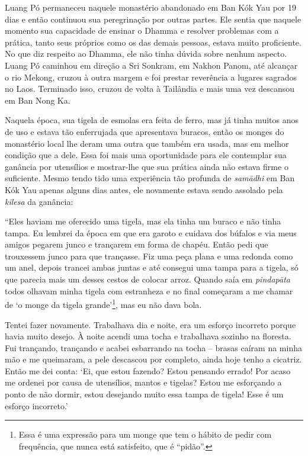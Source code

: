 Luang Pó permaneceu naquele monastério abandonado em Ban Kók Yau por 19
dias e então continuou sua peregrinação por outras partes. Ele sentia
que naquele momento sua capacidade de ensinar o Dhamma e resolver
problemas com a prática, tanto seus próprios como os das demais pessoas,
estava muito proficiente. No que diz respeito ao Dhamma, ele não tinha
dúvida sobre nenhum aspecto. Luang Pó caminhou em direção a Sri Sonkram,
em Nakhon Panom, até alcançar o rio Mekong, cruzou à outra margem e foi
prestar reverência a lugares sagrados no Laos. Terminado isso, cruzou de
volta à Tailândia e mais uma vez descansou em Ban Nong Ka.

Naquela época, sua tigela de esmolas era feita de ferro, mas já tinha
muitos anos de uso e estava tão enferrujada que apresentava buracos,
então os monges do monastério local lhe deram uma outra que também era
usada, mas em melhor condição que a dele. Essa foi mais uma oportunidade
para ele contemplar sua ganância por utensílios e mostrar-lhe que sua
prática ainda não estava firme o suficiente. Mesmo tendo tido uma
experiência tão profunda de \emph{samādhi} em Ban Kók Yau apenas alguns
dias antes, ele novamente estava sendo assolado pela \emph{kilesa} da
ganância:

``Eles haviam me oferecido uma tigela, mas ela tinha um buraco e não
tinha tampa. Eu lembrei da época em que era garoto e cuidava dos búfalos
e via meus amigos pegarem junco e trançarem em forma de chapéu. Então
pedi que trouxessem junco para que trançasse. Fiz uma peça plana e uma
redonda como um anel, depois trancei ambas juntas e até consegui uma
tampa para a tigela, só que parecia mais um desses cestos de colocar
arroz. Quando saía em \emph{pindapāta} todos olhavam minha tigela com
estranheza e no final começaram a me chamar de `o monge da tigela
grande'\footnote{Essa é uma expressão para um monge que tem o hábito de
  pedir com frequência, que nunca está satisfeito, que é ``pidão''.},
mas eu não dava bola.

Tentei fazer novamente. Trabalhava dia e noite, era um esforço incorreto
porque havia muito desejo. À noite acendi uma tocha e trabalhava sozinho
na floresta. Fui trançando, trançando e acabei esbarrando na tocha --
brasas caíram na minha mão e me queimaram, a pele descascou por
completo, ainda hoje tenho a cicatriz. Então me dei conta: `Ei, que
estou fazendo? Estou pensando errado! Por acaso me ordenei por causa de
utensílios, mantos e tigelas? Estou me esforçando a ponto de não dormir,
estou desejando muito essa tampa de tigela! Esse é um esforço
incorreto.'

